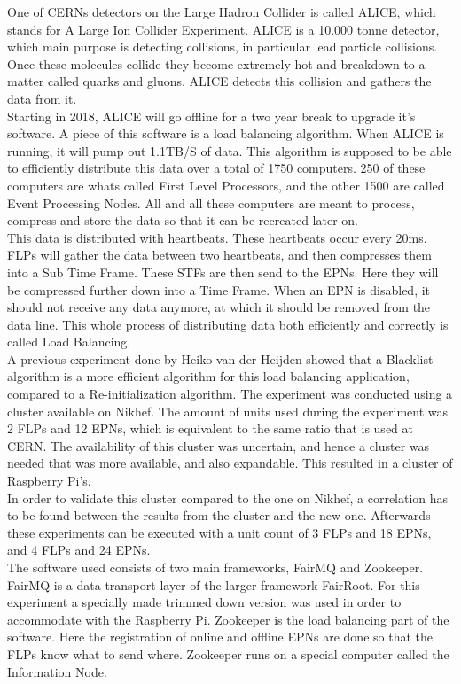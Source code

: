One of CERNs detectors on the Large Hadron Collider is called ALICE, which stands for A Large Ion Collider Experiment. ALICE is a 10.000 tonne detector, which main purpose is detecting collisions, in particular lead particle collisions. Once these molecules collide they become extremely hot and breakdown to a matter called quarks and gluons. ALICE detects this collision and gathers the data from it. \\
Starting in 2018, ALICE will go offline for a two year break to upgrade it's software. A piece of this software is a load balancing algorithm. When ALICE is running, it will pump out 1.1TB/S of data. This algorithm is supposed to be able to efficiently distribute this data over a total of 1750 computers. 250 of these computers are whats called First Level Processors, and the other 1500 are called Event Processing Nodes. All and all these computers are meant to process, compress and store the data so that it can be recreated later on. \\
This data is distributed with heartbeats. These heartbeats occur every 20ms. FLPs will gather the data between two heartbeats, and then compresses them into a Sub Time Frame. These STFs are then send to the EPNs. Here they will be compressed further down into a Time Frame. When an EPN is disabled, it should not receive any data anymore, at which it should be removed from the data line. This whole process of distributing data both efficiently and correctly is called Load Balancing. \\
A previous experiment done by Heiko van der Heijden showed that a Blacklist algorithm is a more efficient algorithm for this load balancing application, compared to a Re-initialization algorithm. The experiment was conducted using a cluster available on Nikhef. The amount of units used during the experiment was 2 FLPs and 12 EPNs, which is equivalent to the same ratio that is used at CERN. The availability of this cluster was uncertain, and hence a cluster was needed that was more available, and also expandable. This resulted in a cluster of Raspberry Pi's. \\
In order to validate this cluster compared to the one on Nikhef, a correlation has to be found between the results from the cluster and the new one. Afterwards these experiments can be executed with a unit count of 3 FLPs and 18 EPNs, and 4 FLPs and 24 EPNs. \\
The software used consists of two main frameworks, FairMQ and Zookeeper. FairMQ is a data transport layer of the larger framework FairRoot. For this experiment a specially made trimmed down version was used in order to accommodate with the Raspberry Pi. Zookeeper is the load balancing part of the software. Here the registration of online and offline EPNs are done so that the FLPs know what to send where. Zookeeper runs on a special computer called the Information Node. \\
